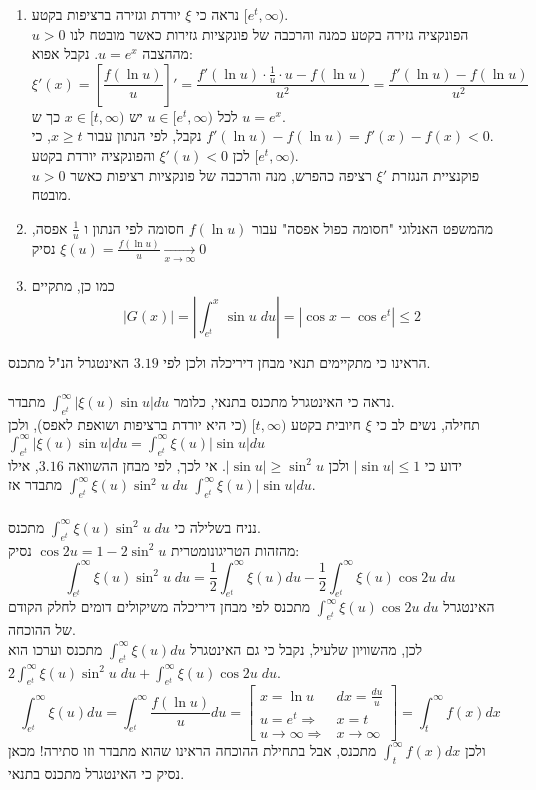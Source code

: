 \documentclass{article}
\begin{document}
\begin{enumerate}[I]
    \item נראה כי $\xi$ יורדת וגזירה ברציפות בקטע $[e^t, \infty)$. \\
          הפונקציה גזירה בקטע כמנה והרכבה של פונקציות גזירות כאשר מובטח לנו $u>0$ מההצבה $u=e^x$. נקבל אפוא:
          \[
              \xi'(x) = [\frac{f(\ln u)}{u}]' =
              \frac{f'(\ln u)\cdot \frac{1}{u} \cdot u - f(\ln u)}{u^2} =
              \frac{f'(\ln u) - f(\ln u)}{u^2}
          \]
          לכל $u\in[e^t, \infty)$ יש $x\in [t,\infty)$ כך ש $u=e^x$. \\
          נקבל, לפי הנתון עבור $x\geq t$, כי $f'(\ln u)-f(\ln u)=f'(x)-f(x)<0$. \\
          לכן $\xi'(u)<0$ והפונקציה יורדת בקטע $[e^t, \infty)$. \\
          פוקנציית הנגזרת $\xi'$ רציפה כהפרש, מנה והרכבה של פונקציות רציפות כאשר $u>0$ מובטח.
    \item מהמשפט האנלוגי "חסומה כפול אפסה" עבור $f(\ln u)$ חסומה לפי הנתון ו $\frac{1}{u}$ אפסה,
          נסיק $\xi(u)=\frac{f(\ln u)}{u}\xrightarrow[x\rightarrow \infty]{}0$
    \item כמו כן, מתקיים
          \[
              |G(x)| = |\int_{e^t}^x \sin u \; du| = |\cos x - \cos e^t| \leq 2
          \]
\end{enumerate}
הראינו כי מתקיימים תנאי מבחן דיריכלה ולכן לפי $3.19$ האינטגרל הנ"ל מתכנס.
\\\\
נראה כי האינטגרל מתכנס בתנאי, כלומר $\int_{e^t}^\infty |\xi(u)\sin u| du$ מתבדר. \\
תחילה, נשים לב כי $\xi$ חיובית בקטע $[t,\infty)$
(כי היא יורדת ברציפות ושואפת לאפס), ולכן $\int_{e^t}^\infty |\xi(u)\sin u| du = \int_{e^t}^\infty \xi(u)|\sin u| du$ \\
ידוע כי $|\sin u|\leq 1$ ולכן $|\sin u| \geq \sin^2u$.
אי לכך, לפי מבחן ההשוואה $3.16$, אילו $\int_{e^t}^\infty \xi(u)\sin^2 u \; du$ מתבדר
אז $\int_{e^t}^\infty \xi(u)|\sin u| du$.
\\\\
נניח בשלילה כי $\int_{e^t}^\infty \xi(u)\sin^2 u \; du$ מתכנס. \\
מהזהות הטריגונומטרית $\cos 2u = 1 - 2\sin^2u$ נסיק:
\[
    \int_{e^t}^\infty \xi(u)\sin^2 u \; du =
    \frac{1}{2}\int_{e^t}^\infty \xi(u) du - \frac{1}{2} \int_{e^t}^\infty \xi(u)\cos 2u \; du
\]
האינטגרל $\int_{e^t}^\infty \xi(u)\cos 2u \; du$ מתכנס לפי מבחן דיריכלה משיקולים דומים לחלק הקודם של ההוכחה.\\
לכן, מהשוויון שלעיל, נקבל כי גם האינטגרל $\int_{e^t}^\infty \xi(u) du$ מתכנס
וערכו הוא $2\int_{e^t}^\infty \xi(u)\sin^2 u \; du + \int_{e^t}^\infty \xi(u)\cos 2u \; du$.
\[
    \int_{e^t}^\infty \xi(u)du =
    \int_{e^t}^\infty \frac{f(\ln u)}{u} du =
    \begin{bmatrix}
        x = \ln u                       & dx = \frac{du}{u}    \\
        u = e^t \Rightarrow             & x = t                \\
        u\rightarrow \infty \Rightarrow & x \rightarrow \infty
    \end{bmatrix} =
    \int_t^\infty f(x)dx
\]
ולכן $\int_t^\infty f(x)dx$ מתכנס,
אבל בתחילת ההוכחה הראינו שהוא מתבדר וזו סתירה! מכאן נסיק כי האינטגרל מתכנס בתנאי.
\end{document}
